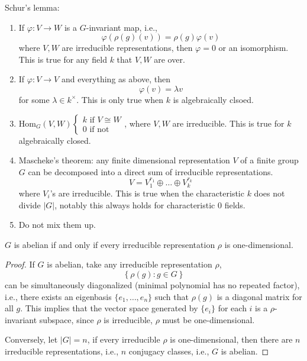 \begin{thm}
    Schur's lemma: 
    \begin{enumerate}
        \item If $\varphi: V\to W$ is a $G$-invariant map, i.e., 
        \begin{equation*}
            \varphi(\rho(g)(v))=\rho(g)\varphi(v)
        \end{equation*} 
        where $V,W$ are irreducible representations, then $\varphi=0$ or an isomorphism. This is true for any field $k$ that $V,W$ are over.
        \item If $\varphi: V\to V$ and everything as above, then 
        \begin{equation*}
            \varphi(v)=\lambda v
        \end{equation*}
        for some $\lambda\in k^\times$. This is only true when $k$ is algebraically clsoed.
        \item $\text{Hom}_G(V,W)\begin{cases}
            k \text{ if } V\cong W\\
            0 \text{ if  not}
        \end{cases}$, where $V,W$ are irreducible. This is true for $k$ algebraically closed.
        \item Mascheke's theorem: any finite dimensional representation $V$ of a finite group $G$ can be decomposed into a direct sum of irreducible representations.
        \begin{equation*}
            V=V_1^{r_1}\oplus\dots\oplus V_k^{r_k}
        \end{equation*}
        where $V_i$'s are irreducible. This is true when the characteristic $k$ does not divide $|G|$, notably this always holds for characteristic $0$ fields.
        \item Do not mix them up.
    \end{enumerate}
\end{thm}


\begin{prop}
    $G$ is abelian if and only if every irreducible representation $\rho$ is one-dimensional.
\end{prop}
\begin{proof}
    If $G$ is abelian, take any irreducible representation $\rho$, 
    \begin{equation*}
        \left\{\rho(g): g\in G\right\}
    \end{equation*}
    can be simultaneously diagonalized (minimal polynomial has no repeated factor), i.e., there exists an eigenbasis $\{e_1,\dots,e_n\}$ such that $\rho(g)$ is a diagonal matrix for all $g$. This implies that the vector space generated by $\{e_i\}$ for each $i$ is a $\rho$-invariant subspace, since $\rho$ is irreducible, $\rho$ must be one-dimensional. 

    Conversely, let $|G|=n$, if every irreducible $\rho$ is one-dimensional, then there are $n$ irreducible representations, i.e., $n$ conjugacy classes, i.e., $G$ is abelian.
\end{proof}

